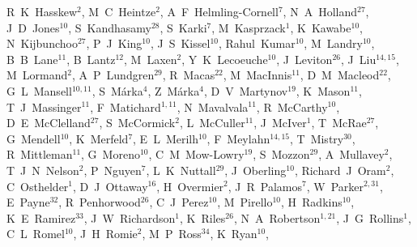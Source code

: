 \documentclass[12pt]{iopart}
\begin{document}
{R~K~Hasskew$^{2}$,  %
M~C~Heintze$^{2}$,  %
A~F~Helmling-Cornell$^{7}$,  %
N~A~Holland$^{27}$,  %
J~D~Jones$^{10}$,  %
S~Kandhasamy$^{28}$,  %
S~Karki$^{7}$,  %
M~Kasprzack$^{1}$,  %
K~Kawabe$^{10}$,  %
N~Kijbunchoo$^{27}$,  %
P~J~King$^{10}$,  %
J~S~Kissel$^{10}$,  %
Rahul~Kumar$^{10}$,  %
M~Landry$^{10}$,  %
B~B~Lane$^{11}$,  %
B~Lantz$^{12}$,  %
M~Laxen$^{2}$,  %
Y~K~Lecoeuche$^{10}$,  %
J~Leviton$^{26}$,  %
J~Liu$^{14,15}$,  %
M~Lormand$^{2}$,  %
A~P~Lundgren$^{29}$,  %
R~Macas$^{22}$,  %
M~MacInnis$^{11}$,  %
D~M~Macleod$^{22}$,  %
G~L~Mansell$^{10,11}$,  %
S~M\'arka$^{4}$,  %
Z~M\'arka$^{4}$,  %
D~V~Martynov$^{19}$,  %
K~Mason$^{11}$,  %
T~J~Massinger$^{11}$,  %
F~Matichard$^{1,11}$,  %
N~Mavalvala$^{11}$,  %
R~McCarthy$^{10}$,  %
D~E~McClelland$^{27}$,  %
S~McCormick$^{2}$,  %
L~McCuller$^{11}$,  %
J~McIver$^{1}$,  %
T~McRae$^{27}$,  %
G~Mendell$^{10}$,  %
K~Merfeld$^{7}$,  %
E~L~Merilh$^{10}$,  %
F~Meylahn$^{14,15}$,  %
T~Mistry$^{30}$,  %
R~Mittleman$^{11}$,  %
G~Moreno$^{10}$,  %
C~M~Mow-Lowry$^{19}$,  %
S~Mozzon$^{29}$,  %
A~Mullavey$^{2}$,  %
T~J~N~Nelson$^{2}$,  %
P~Nguyen$^{7}$,  %
L~K~Nuttall$^{29}$,  %
J~Oberling$^{10}$,  %
Richard~J~Oram$^{2}$,  %
C~Osthelder$^{1}$,  %
D~J~Ottaway$^{16}$,  %
H~Overmier$^{2}$,  %
J~R~Palamos$^{7}$,  %
W~Parker$^{2,31}$,  %
E~Payne$^{32}$,  %
R~Penhorwood$^{26}$,  %
C~J~Perez$^{10}$,  %
M~Pirello$^{10}$,  %
H~Radkins$^{10}$,  %
K~E~Ramirez$^{33}$,  %
J~W~Richardson$^{1}$,  %
K~Riles$^{26}$,  %
N~A~Robertson$^{1,21}$,  %
J~G~Rollins$^{1}$,  %
C~L~Romel$^{10}$,  %
J~H~Romie$^{2}$,  %
M~P~Ross$^{34}$,  %
K~Ryan$^{10}$,  %
}
\end{document}
